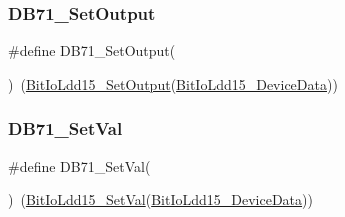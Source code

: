 \mbox{\label{group___d_b71__module_gaceafb220a6540f1805ab770146092bfb}} 
\subsubsection{\texorpdfstring{D\+B71\+\_\+\+Set\+Output}{DB71\_SetOutput}}
{\footnotesize\ttfamily \#define D\+B71\+\_\+\+Set\+Output(\begin{DoxyParamCaption}{ }\end{DoxyParamCaption})~(\hyperlink{group___bit_io_ldd15__module_ga507454e3c3f8d84768c97902fad489a1}{Bit\+Io\+Ldd15\+\_\+\+Set\+Output}(\hyperlink{group___bit_io_ldd15__module_ga7e053a3640af5a7522d2864dea4be75f}{Bit\+Io\+Ldd15\+\_\+\+Device\+Data}))}

\mbox{\label{group___d_b71__module_gacd074e92d172aad2f6212692966bc0ce}} 
\subsubsection{\texorpdfstring{D\+B71\+\_\+\+Set\+Val}{DB71\_SetVal}}
{\footnotesize\ttfamily \#define D\+B71\+\_\+\+Set\+Val(\begin{DoxyParamCaption}{ }\end{DoxyParamCaption})~(\hyperlink{group___bit_io_ldd15__module_ga49339ddbfe8f0278ee4f854d61235f4d}{Bit\+Io\+Ldd15\+\_\+\+Set\+Val}(\hyperlink{group___bit_io_ldd15__module_ga7e053a3640af5a7522d2864dea4be75f}{Bit\+Io\+Ldd15\+\_\+\+Device\+Data}))}

